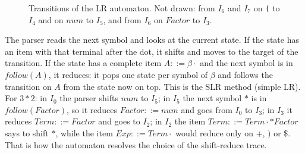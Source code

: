 \begin{figure}[h]
\centering
{}
\caption{Transitions of the LR automaton. Not drawn: from $I_6$ and $I_7$ on \texttt{(} to $I_4$ and on $\mathit{num}$ to $I_5$, and from $I_6$ on $\mathit{Factor}$ to $I_3$.}
\label{fig:lr-automaton}
\end{figure}

The parser reads the next symbol and looks at the current state. If the state
has an item with that terminal after the dot, it shifts and moves to the
target of the transition. If the state has a complete item $A ::= \beta\cdot$ and
the next symbol is in $\mathit{follow}(A)$, it reduces: it pops one state per
symbol of $\beta$ and follows the transition on $A$ from the state now on top.
This is the SLR method (simple LR). For $3*2$: in $I_0$ the parser shifts
$\mathit{num}$ to $I_5$; in $I_5$ the next symbol $*$ is in
$\mathit{follow}(\mathit{Factor})$, so it reduces $\mathit{Factor} ::= \mathit{num}$
and goes from $I_0$ to $I_3$; in $I_3$ it reduces $\mathit{Term} ::= \mathit{Factor}$
and goes to $I_2$; in $I_2$ the item $\mathit{Term} ::= \mathit{Term}\cdot*\mathit{Factor}$
says to shift $*$, while the item $\mathit{Exp} ::= \mathit{Term}\cdot$ would reduce
only on $+$, $)$ or \$. That is how the automaton resolves the choice of the
shift-reduce trace.

